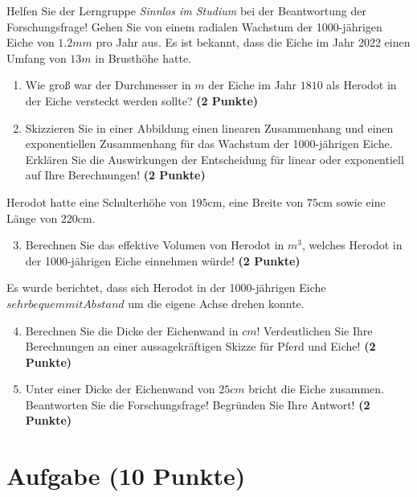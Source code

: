 \documentclass[a4paper, 9pt]{scrartcl}\usepackage[]{graphicx}\usepackage[]{xcolor}
\begin{document}
\vspace{1Ex}

Helfen Sie der Lerngruppe \textit{Sinnlos im Studium} bei der Beantwortung der Forschungsfrage! Gehen Sie von einem radialen Wachstum der 1000-jährigen Eiche von $1.2mm$ pro Jahr aus. Es ist bekannt, dass die Eiche im Jahr 2022 einen Umfang von $13m$ in Brusthöhe hatte.

\begin{enumerate}
\item Wie groß war der Durchmesser in $m$ der Eiche im Jahr $1810$ als Herodot in der Eiche versteckt werden sollte? \textbf{(2 Punkte)}
\item Skizzieren Sie in einer Abbildung einen linearen Zusammenhang und einen exponentiellen Zusammenhang für das Wachstum der 1000-jährigen Eiche. Erklären Sie die Auswirkungen der Entscheidung für linear oder exponentiell auf Ihre Berechnungen! \textbf{(2 Punkte)}
\end{enumerate}
 
Herodot hatte eine Schulterhöhe von $195$cm, eine Breite von $75$cm sowie eine Länge von  $220$cm.

\begin{enumerate}
  \setcounter{enumi}{2}
\item Berechnen Sie das effektive Volumen von Herodot in $m^3$, welches Herodot in der 1000-jährigen Eiche einnehmen würde! \textbf{(2 Punkte)}
\end{enumerate}

Es wurde berichtet, dass sich Herodot in der 1000-jährigen Eiche $sehr bequem mit Abstand$ um die eigene Achse drehen konnte.

\begin{enumerate}
  \setcounter{enumi}{3}
\item Berechnen Sie die Dicke der Eichenwand in $cm$! Verdeutlichen Sie Ihre Berechnungen an einer aussagekräftigen Skizze für Pferd und Eiche! \textbf{(2 Punkte)} 
\item Unter einer Dicke der Eichenwand von $25cm$ bricht die Eiche zusammen. Beantworten Sie die Forschungsfrage! Begründen Sie Ihre Antwort! \textbf{(2 Punkte)} 
\end{enumerate}


 
\clearpage

\section{Aufgabe \hfill (10 Punkte)}
\end{document}
